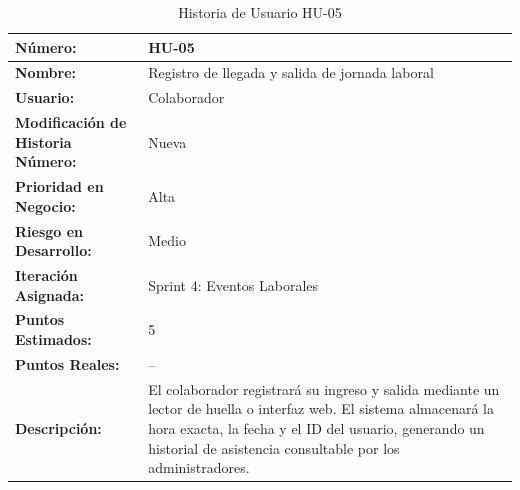 \begin{table}[h]
	\centering
	\caption{Historia de Usuario HU-05}
	\begin{tabular}{|p{5cm}|p{9cm}|}
		\hline
		\textbf{Número:}                          & HU-05                                                                                                                                                                                                \\ \hline
		\textbf{Nombre:}                          & Registro de llegada y salida de jornada laboral                                                                                                                                                      \\ \hline
		\textbf{Usuario:}                         & Colaborador                                                                                                                                                                                          \\ \hline
		\textbf{Modificación de Historia Número:} & Nueva                                                                                                                                                                                                \\ \hline
		\textbf{Prioridad en Negocio:}            & Alta                                                                                                                                                                                                 \\ \hline
		\textbf{Riesgo en Desarrollo:}            & Medio                                                                                                                                                                                                \\ \hline
		\textbf{Iteración Asignada:}              & Sprint 4: Eventos Laborales                                                                                                                                                                          \\ \hline
		\textbf{Puntos Estimados:}                & 5                                                                                                                                                                                                    \\ \hline
		\textbf{Puntos Reales:}                   & --                                                                                                                                                                                                   \\ \hline
		\textbf{Descripción:}                     &
		El colaborador registrará su ingreso y salida mediante un lector de huella o interfaz web. El sistema almacenará la hora exacta, la fecha y el ID del usuario, generando un historial de asistencia consultable por los administradores.


\end{tabular}
\end{table}
